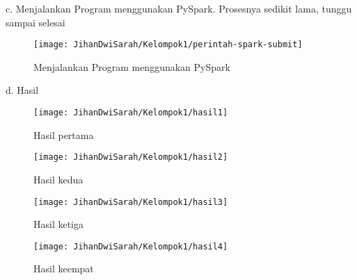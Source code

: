 \begin{enumerate}
c. Menjalankan Program menggunakan PySpark. Prosesnya sedikit lama, tunggu sampai selesai
\begin{figure}[!ht]
\texttt{[image: JihanDwiSarah/Kelompok1/perintah-spark-submit]}
\caption{Menjalankan Program menggunakan PySpark}
\label{gam:perintah-spark-submit}
\end{figure}

d. Hasil 

\begin{figure}[!ht]
\texttt{[image: JihanDwiSarah/Kelompok1/hasil1]}
\caption{Hasil pertama}
\label{gam:hasil1}
\end{figure}

\begin{figure}[!ht]
\texttt{[image: JihanDwiSarah/Kelompok1/hasil2]}
\caption{Hasil kedua}
\label{gam:hasil2}
\end{figure}

\newpage
\begin{figure}[!ht]
\texttt{[image: JihanDwiSarah/Kelompok1/hasil3]}
\caption{Hasil ketiga}
\label{gam:hasil3}
\end{figure}

\begin{figure}[!ht]
\texttt{[image: JihanDwiSarah/Kelompok1/hasil4]}
\caption{Hasil keempat}
\label{gam:hasil4}
\end{figure}

\end{enumerate}